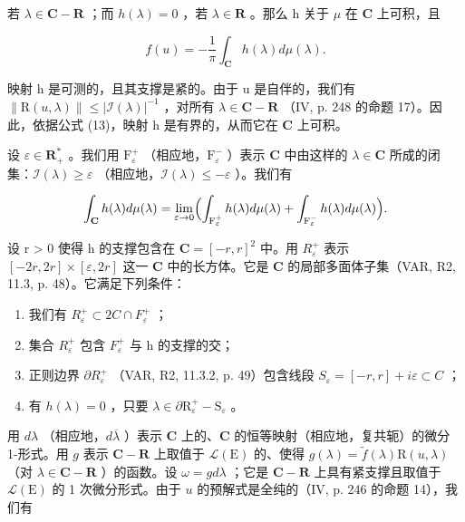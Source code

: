 若 \(\lambda\in\mathbf{C} - \mathbf{R}\) ；而 \(h(\lambda)=0\) ，若 \(\lambda\in\mathbf{R}\) 。那么 h 关于 \(\mu\) 在 \(\mathbf{C}\) 上可积，且

\[
f (u) = - \frac {1}{\pi} \int_ {\mathbf {C}} h (\lambda) d \mu (\lambda).
\]

映射 h 是可测的，且其支撑是紧的。由于 u 是自伴的，我们有 \(\|\mathrm{R}(u,\lambda)\| \leqslant |\mathcal{I}(\lambda)|^{-1}\) ，对所有 \(\lambda \in \mathbf{C} - \mathbf{R}\) （IV, p. 248 的命题 17）。因此，依据公式 (13)，映射 h 是有界的，从而它在 \(\mathbf{C}\) 上可积。

设 \(\varepsilon \in \mathbf{R}_{+}^{*}\) 。我们用 \(\mathrm{F}_{\varepsilon}^{+}\) （相应地，\(\mathrm{F}_{\varepsilon}^{-}\) ）表示 \(\mathbf{C}\) 中由这样的 \(\lambda \in \mathbf{C}\) 所成的闭集：\(\mathcal{I}(\lambda) \geqslant \varepsilon\) （相应地，\(\mathcal{I}(\lambda) \leqslant -\varepsilon\) ）。我们有

\[
\int_ {\mathbf {C}} h (\lambda) d \mu (\lambda) = \lim _ {\varepsilon \to 0} \Bigl (\int_ {\mathrm{F} _ {\varepsilon} ^ {+}} h (\lambda) d \mu (\lambda) + \int_ {\mathrm{F} _ {\varepsilon} ^ {-}} h (\lambda) d \mu (\lambda) \Bigr).
\]

设 r > 0 使得 h 的支撑包含在 \(\mathbf{C} = [-r, r]^{2}\) 中。用 \(R_{\varepsilon}^{+}\) 表示 \([-2r, 2r] \times [\varepsilon, 2r]\) 这一 \(\mathbf{C}\) 中的长方体。它是 \(\mathbf{C}\) 的局部多面体子集（VAR, R2, 11.3, p. 48）。它满足下列条件：

\begin{enumerate}
\def\labelenumi{(\roman{enumi})}
\item
  我们有 \(R_{\varepsilon}^{+} \subset 2C \cap F_{\varepsilon}^{+}\) ；
\item
  集合 \(R_{\varepsilon}^{+}\) 包含 \(F_{\varepsilon}^{+}\) 与 h 的支撑的交；
\item
  正则边界 \(\partial R_{\varepsilon}^{+}\) （VAR, R2, 11.3.2, p. 49）包含线段 \(S_{\varepsilon} = [-r, r] + i\varepsilon \subset C\) ；
\item
  有 \(h(\lambda) = 0\) ，只要 \(\lambda \in \partial \mathrm{R}_{\varepsilon}^{+} - \mathrm{S}_{\varepsilon}\) 。
\end{enumerate}

用 \(d\lambda\) （相应地，\(d\overline{\lambda}\) ）表示 \(\mathbf{C}\) 上的、\(\mathbf{C}\) 的恒等映射（相应地，复共轭）的微分 1-形式。用 \(g\) 表示 \(\mathbf{C} - \mathbf{R}\) 上取值于 \(\mathcal{L}(\mathrm{E})\) 的、使得 \(g(\lambda) = \widetilde{f}(\lambda)\mathrm{R}(u,\lambda)\) （对 \(\lambda \in \mathbf{C} - \mathbf{R}\) ）的函数。设 \(\omega = g d\lambda\) ；它是 \(\mathbf{C} - \mathbf{R}\) 上具有紧支撑且取值于 \(\mathcal{L}(\mathrm{E})\) 的 1 次微分形式。由于 \(u\) 的预解式是全纯的（IV, p. 246 的命题 14），我们有

